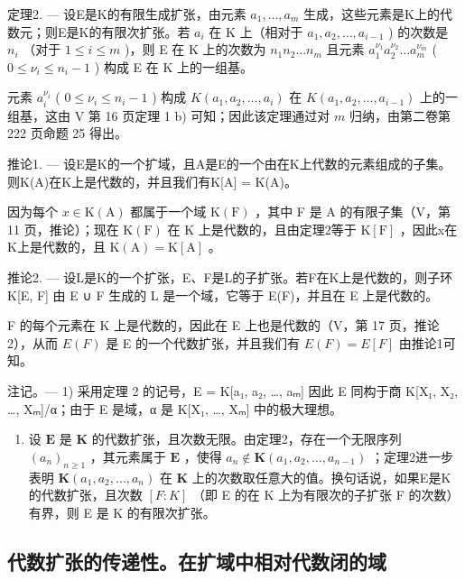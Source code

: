 定理2. --- 设E是K的有限生成扩张，由元素 \(a_1, \ldots, a_m\) 生成，这些元素是K上的代数元；则E是K的有限次扩张。若 \(a_i\) 在 K 上（相对于 \(a_1, a_2, \ldots, a_{i-1}\) ) 的次数是 \(n_i\) （对于 \(1 \leq i \leq m\) )，则 E 在 K 上的次数为 \(n_1 n_2 \ldots n_m\) 且元素 \(a_1^{\nu_1} a_2^{\nu_2} \ldots a_m^{\nu_m}\) ( \(0 \leq \nu_i \leq n_i - 1\) ) 构成 E 在 K 上的一组基。

元素 \(a_i^{\nu_i}\) ( \(0 \leqslant \nu_i \leqslant n_i - 1\) ) 构成 \(K(a_1, a_2, \ldots, a_i)\) 在 \(K(a_1, a_2, \ldots, a_{i-1})\) 上的一组基，这由 V 第 16 页定理 1 b) 可知；因此该定理通过对 \(m\) 归纳，由第二卷第 222 页命题 25 得出。

推论1. --- 设E是K的一个扩域，且A是E的一个由在K上代数的元素组成的子集。则K(A)在K上是代数的，并且我们有K{[}A{]} = K(A)。

因为每个 \(x \in \mathrm{K}(\mathrm{A})\) 都属于一个域 \(\mathrm{K}(\mathrm{F})\) ，其中 F 是 A 的有限子集（V，第 11 页，推论）；现在 \(\mathrm{K}(\mathrm{F})\) 在 K 上是代数的，且由定理2等于 \(\mathrm{K}[\mathrm{F}]\) ，因此x在K上是代数的，且 \(\mathrm{K}(\mathrm{A}) = \mathrm{K}[\mathrm{A}]\) 。

推论2. --- 设L是K的一个扩张，E、F是L的子扩张。若F在K上是代数的，则子环K{[}E, F{]} 由 E ∪ F 生成的 L 是一个域，它等于 E(F)，并且在 E 上是代数的。

F 的每个元素在 K 上是代数的，因此在 E 上也是代数的（V，第 17 页，推论 2），从而 \(E(F)\) 是 E 的一个代数扩张，并且我们有 \(E(F) = E[F]\) 由推论1可知。

注记。--- 1) 采用定理 2 的记号，E = K{[}a₁, a₂, \ldots, aₘ{]} 因此 E 同构于商 K{[}X₁, X₂, \ldots, Xₘ{]}/α；由于 E 是域，α 是 K{[}X₁, \ldots, Xₘ{]} 中的极大理想。

\begin{enumerate}
\def\labelenumi{\arabic{enumi})}
\setcounter{enumi}{1}
\tightlist
\item
  设 \(\mathbf{E}\) 是 \(\mathbf{K}\) 的代数扩张，且次数无限。由定理2，存在一个无限序列 \((a_n)_{n \geq 1}\) ，其元素属于 \(\mathbf{E}\) ，使得 \(a_n \notin \mathbf{K}(a_1, a_2, \ldots, a_{n-1})\) ；定理2进一步表明 \(\mathbf{K}(a_1, a_2, \ldots, a_n)\) 在 \(\mathbf{K}\) 上的次数取任意大的值。换句话说，如果E是K的代数扩张，且次数 \([F:K]\) （即 E 的在 K 上为有限次的子扩张 F 的次数）有界，则 E 是 K 的有限次扩张。
\end{enumerate}

\subsection{代数扩张的传递性。在扩域中相对代数闭的域}

